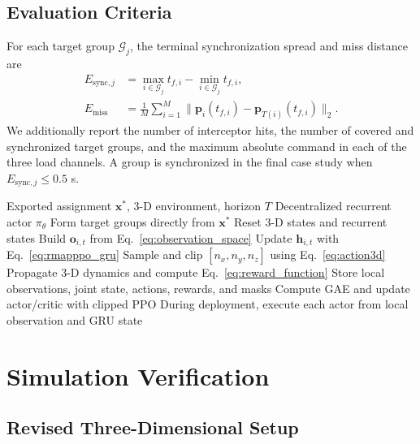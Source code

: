 \documentclass[lettersize,journal]{IEEEtran}
\begin{document}
\subsection{Evaluation Criteria}
\label{subsec:eval}

For each target group \(\mathcal G_j\), the terminal synchronization spread and
miss distance are
\begin{align}
E_{\mathrm{sync},j}&=\max_{i\in\mathcal G_j}t_{f,i}
-\min_{i\in\mathcal G_j}t_{f,i},\\
E_{\mathrm{miss}}&=\frac{1}{M}\sum_{i=1}^{M}
\|\mathbf p_i(t_{f,i})-\mathbf p_{T(i)}(t_{f,i})\|_2 .
\end{align}
We additionally report the number of interceptor hits, the number of covered and
synchronized target groups, and the maximum absolute command in each of the
three load channels. A group is synchronized in the final case study when
\(E_{\mathrm{sync},j}\le0.5\) s.

\begin{algorithm}[!t]
\caption{R-MAPPO Cooperative Interception Guidance}
\label{alg:r_mappo}
\footnotesize
\begin{algorithmic}[1]
\REQUIRE Exported assignment \(\mathbf{x}^{*}\), 3-D environment, horizon \(T\)
\ENSURE Decentralized recurrent actor \(\pi_\theta\)
\STATE Form target groups directly from \(\mathbf{x}^{*}\)
    \STATE Reset 3-D states and recurrent states
            \STATE Build \(\mathbf{o}_{i,t}\) from Eq.~\eqref{eq:observation_space}
            \STATE Update \(\mathbf{h}_{i,t}\) with Eq.~\eqref{eq:rmapppo_gru}
            \STATE Sample and clip \([n_x,n_y,n_z]\) using Eq.~\eqref{eq:action3d}
        \ENDFOR
        \STATE Propagate 3-D dynamics and compute Eq.~\eqref{eq:reward_function}
        \STATE Store local observations, joint state, actions, rewards, and masks
    \ENDFOR
    \STATE Compute GAE and update actor/critic with clipped PPO
\ENDFOR
\STATE During deployment, execute each actor from local observation and GRU state
\end{algorithmic}
\end{algorithm}


\section{Simulation Verification}
\label{sec:simulation}

\subsection{Revised Three-Dimensional Setup}
\label{subsec:setup}
\end{document}
